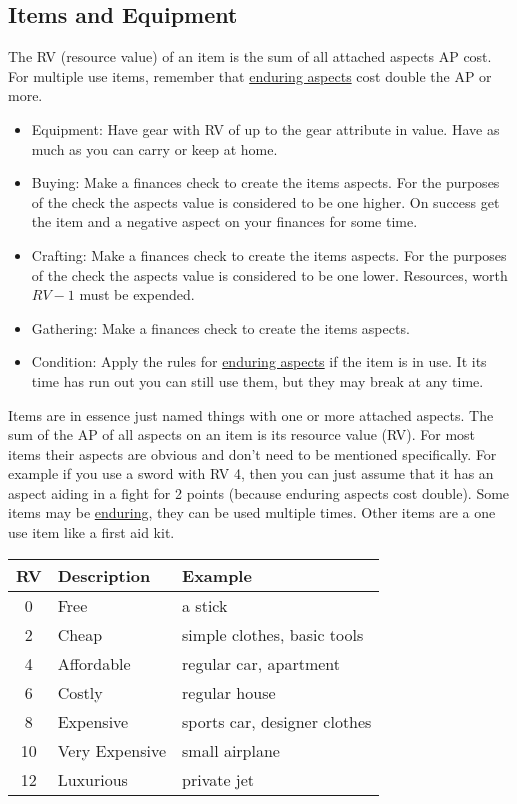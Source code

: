 \documentclass[11pt]{article}
\begin{document}
{\subsection{Items and Equipment}
\label{sec:org918c4bb}
\begin{short}
The RV (resource value) of an item is the sum of all attached aspects AP cost. For multiple use items, remember that \hyperref[sec:orgdf4d4d8]{enduring aspects} cost double the AP or more.
\begin{itemize}
\item Equipment: Have gear with RV of up to the gear attribute in value. Have as much as you can carry or keep at home.
\item Buying: Make a finances check to create the items aspects. For the purposes of the check the aspects value is considered to be one higher. On success get the item and a negative aspect  on your finances for some time.
\item Crafting: Make a finances check to create the items aspects. For the purposes of the check the aspects value is considered to be one lower. Resources, worth \(RV-1\) must be expended.
\item Gathering: Make a finances check to create the items aspects.
\item Condition: Apply the rules for \hyperref[sec:orgdf4d4d8]{enduring aspects} if the item is in use. It its time has run out you can still use them, but they may break at any time.
\end{itemize}
\end{short}

Items are in essence just named things with one or more attached aspects. The sum of the AP of all aspects on an item is its resource value (RV). For most items their aspects are obvious and don't need to be mentioned specifically. For example if you use a sword with RV 4, then you can just assume that it has an aspect aiding in a fight for 2 points (because enduring aspects cost double). Some items may be \hyperref[sec:orgdf4d4d8]{enduring}, they can be used multiple times. Other items are a one use item like a first aid kit. 

\begin{center}
\begin{tabular}{c|l|l}
\textbf{RV} & \textbf{Description} & \textbf{Example}\\
\hline
0 & Free & a stick\\
2 & Cheap & simple clothes, basic tools\\
4 & Affordable & regular car, apartment\\
6 & Costly & regular house\\
8 & Expensive & sports car, designer clothes\\
10 & Very Expensive & small airplane\\
12 & Luxurious & private jet\\
\end{tabular}
\end{center}
}
\end{document}
